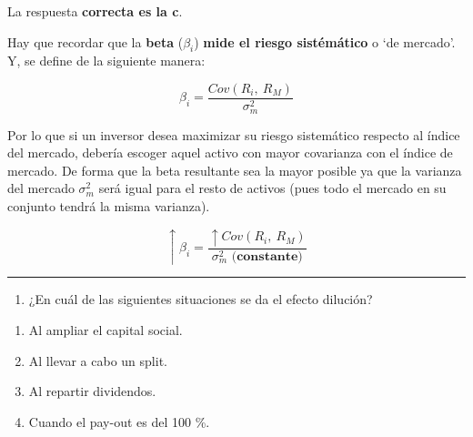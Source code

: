 \documentclass[
  letterpaper,
  DIV=11,
  numbers=noendperiod]{scrreprt}
\providecommand{\tightlist}{%
  \setlength{\itemsep}{0pt}\setlength{\parskip}{0pt}}\usepackage{longtable,booktabs,array}
\begin{document}
\begin{tcolorbox}[enhanced jigsaw, left=2mm, opacityback=0, colback=white, breakable, arc=.35mm, bottomrule=.15mm, rightrule=.15mm, toprule=.15mm, leftrule=.75mm, colframe=quarto-callout-tip-color-frame]
\begin{minipage}[t]{5.5mm}
\textcolor{quarto-callout-tip-color}{\faLightbulb}
\end{minipage}%
\begin{minipage}[t]{\textwidth - 5.5mm}

La respuesta \textbf{correcta es la c}.

Hay que recordar que la \textbf{beta} (\(\beta_i\)) \textbf{mide el
riesgo sistémático} o `de mercado'. Y, se define de la siguiente manera:

\[  \beta_i=\frac{ Cov(R_i,\ R_M)}{\sigma^2_m}\]

Por lo que si un inversor desea maximizar su riesgo sistemático respecto
al índice del mercado, debería escoger aquel activo con mayor covarianza
con el índice de mercado. De forma que la beta resultante sea la mayor
posible ya que la varianza del mercado \(\sigma^2_m\) será igual para el
resto de activos (pues todo el mercado en su conjunto tendrá la misma
varianza).

\[\uparrow  \beta_i=\frac{\uparrow Cov(R_i,\ R_M)}{\sigma^2_m\textbf{ (constante)}}\]

\end{minipage}%
\end{tcolorbox}

\begin{center}\rule{0.5\linewidth}{0.5pt}\end{center}

\begin{enumerate}
\def\labelenumi{\arabic{enumi}.}
\setcounter{enumi}{63}
\tightlist
\item
  ¿En cuál de las siguientes situaciones se da el efecto dilución?
\end{enumerate}

\begin{enumerate}
\def\labelenumi{\alph{enumi}.}
\item
  Al ampliar el capital social.
\item
  Al llevar a cabo un split.
\item
  Al repartir dividendos.
\item
  Cuando el pay-out es del 100 \%.
\end{enumerate}
\end{document}
